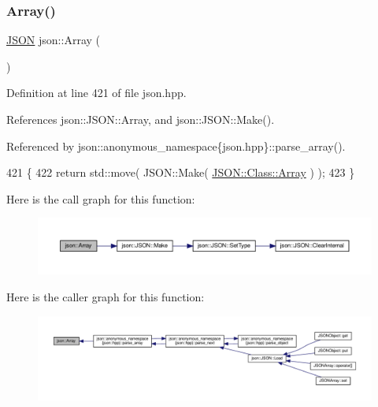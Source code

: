 \subsubsection{\texorpdfstring{Array()}{Array()}\hspace{0.1cm}{\footnotesize\ttfamily [1/2]}}
{\footnotesize\ttfamily \mbox{\hyperlink{classjson_1_1_j_s_o_n}{J\+S\+ON}} json\+::\+Array (\begin{DoxyParamCaption}{ }\end{DoxyParamCaption})\hspace{0.3cm}{\ttfamily [inline]}}



Definition at line 421 of file json.\+hpp.



References json\+::\+J\+S\+O\+N\+::\+Array, and json\+::\+J\+S\+O\+N\+::\+Make().



Referenced by json\+::anonymous\+\_\+namespace\{json.\+hpp\}\+::parse\+\_\+array().


\begin{DoxyCode}
421                     \{
422     \textcolor{keywordflow}{return} std::move( JSON::Make( \mbox{\hyperlink{namespacejson_a8c39b1bf99577bc140f0647d0192219f}{JSON::Class::Array}} ) );
423 \}
\end{DoxyCode}
Here is the call graph for this function\+:
\nopagebreak
\begin{figure}[H]
\begin{center}
\leavevmode
\includegraphics[width=350pt]{namespacejson_a805054691c80da00fd9129387f834c21_cgraph}
\end{center}
\end{figure}
Here is the caller graph for this function\+:
\nopagebreak
\begin{figure}[H]
\begin{center}
\leavevmode
\includegraphics[width=350pt]{namespacejson_a805054691c80da00fd9129387f834c21_icgraph}
\end{center}
\end{figure}
\mbox{\label{namespacejson_a8c39b1bf99577bc140f0647d0192219f}} 
